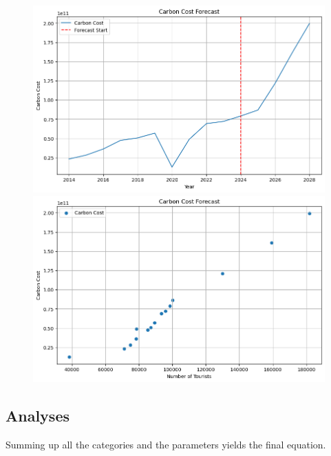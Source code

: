 \begin{figure}[H]
    \centering
    \begin{minipage}[t]{0.49\textwidth}
        \centering
        \includegraphics[width=1\textwidth]{C_Cost_Sitka.png}
    \end{minipage}
    \hfill
    \begin{minipage}[t]{0.49\textwidth}
        \centering
        \includegraphics[width=1\textwidth]{C_to_People_Sitka.png}
    \end{minipage}
\end{figure}

\subsection{Analyses}

Summing up all the categories and the parameters yields the final equation.

